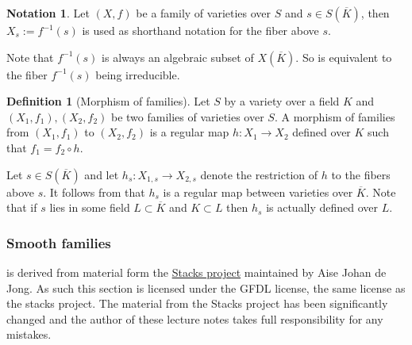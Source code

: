 \documentclass[a4paper,12pt,reqno]{amsart}
\theoremstyle{definition}
\newtheorem{definition}[lemma]{Definition}
\newtheorem{notation}[lemma]{Notation}
\numberwithin{lemma}{section}
\numberwithin{equation}{section}
\numberwithin{figure}{section}
\begin{document}
\begin{notation}\label{def:fiber-notation}
Let $(X,f)$ be a family of varieties over $S$ and $s \in S(\overline K)$, then $X_s :=f^{-1}(s)$ is used as shorthand notation for the fiber above $s$.
\end{notation}
Note that $f^{-1}(s)$ is always an algebraic subset of $X(\overline K)$. So  is equivalent to the fiber $f^{-1}(s)$ being irreducible.

\begin{definition}[Morphism of families]\label{def:family-of-varieties-morphism}
Let $S$ by a variety over a field $K$ and $(X_1,f_1), (X_2,f_2)$ be two families of varieties over $S$. A morphism of families from $(X_1,f_1)$ to $(X_2,f_2)$ is a regular map $h: X_1 \to X_2$ defined over $K$ such that $f_1 = f_2 \circ h$.
\begin{center}
\end{center}
\end{definition}

Let $s \in  S(\overline K)$ and let $h_s : X_{1,s} \to X_{2,s}$  denote the restriction of $h$ to the fibers above $s$. It follows from  that $h_s$ is a regular map between varieties over $\overline K$. Note that if $s$ lies in some field $L \subset \overline K$ and $K \subset L$ then $h_s$ is actually defined over $L.$

\subsubsection{Smooth families}\label{sec:smooth-families}
 is derived from material form the \href{https://stacks.math.columbia.edu/}{Stacks project} maintained by Aise Johan de Jong. As such this section is licensed under the GFDL license, the same license as the stacks project. The material from the Stacks project has been significantly changed and the author of these lecture notes takes full responsibility for any mistakes.
\end{document}

